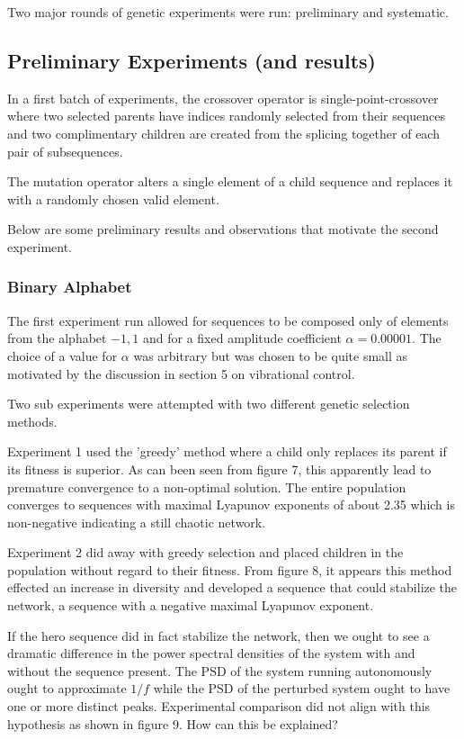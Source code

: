 \documentclass[12pt]{article}
\begin{document}
Two major rounds of genetic experiments were run: preliminary and systematic.

\subsection{Preliminary Experiments (and results)}

In a first batch of experiments, the crossover operator is
single-point-crossover where two selected parents
have indices randomly selected from their sequences and two complimentary
children are created from the splicing together of each pair of subsequences.

The mutation operator alters a single element of a child sequence and
replaces it with a randomly chosen valid element.

Below are some preliminary results and observations that motivate the second
experiment.

\subsubsection{Binary Alphabet}
The first experiment run allowed for sequences to be composed only of elements
from the alphabet ${-1, 1}$ and for a fixed amplitude coefficient
$\alpha=0.00001$.  The choice of a value for $\alpha$ was arbitrary but was
chosen to be quite small as motivated by the discussion in section 5 on
vibrational control.

Two sub experiments were attempted with two different genetic selection methods.

Experiment 1 used the 'greedy' method where a child only replaces its parent if
its fitness is superior.  As can been seen from figure 7,
this apparently lead to premature convergence to a non-optimal solution.
The entire population converges to sequences with maximal Lyapunov exponents
of about 2.35 which is non-negative indicating a still chaotic network.

Experiment 2 did away with greedy selection and placed children in the
population without regard to their fitness.  From figure 8,
it appears this method effected an increase in diversity and developed
a sequence that could stabilize the network, a sequence with a negative
maximal Lyapunov exponent.

If the hero sequence did in fact stabilize the network, then we ought to see
a dramatic difference in the power spectral densities of the system with and
without the sequence present.  The PSD of the system running autonomously ought
to approximate $1/f$ while the PSD of the perturbed system ought to have one or more distinct peaks.  Experimental comparison did not align with this
hypothesis as shown in figure 9.  How can this be explained?
\end{document}
